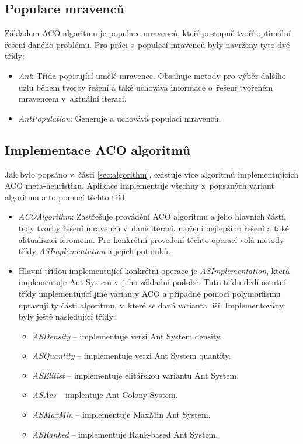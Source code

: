 \documentclass[a4paper, 12pt]{article}
\begin{document}
\subsection{Populace mravenců}
Základem ACO algoritmu je populace mravenců, kteří postupně tvoří optimální řešení daného problému. Pro práci s~populací mravenců byly navrženy tyto dvě třídy:
\begin{itemize}
  \item \emph{Ant}: Třída popisující umělé mravence. Obsahuje metody pro výběr dalšího uzlu během tvorby řešení a také uchovává informace o~řešení
  tvořeném mravencem
    v~aktuální iteraci.
  \item \emph{AntPopulation}: Generuje a uchovává populaci mravenců.
\end{itemize}

\subsection{Implementace ACO algoritmů}
Jak bylo popsáno v~části \ref{sec:algorithm}, existuje více algoritmů implementujících ACO meta-heuristiku.
Aplikace implementuje všechny z~popsaných variant algoritmu a to pomocí těchto tříd 

\begin{itemize}
  \item \emph{ACOAlgorithm}: Zastřešuje provádění ACO algoritmu a jeho hlavních částí, tedy tvorby řešení mravenců v~dané iteraci,
  uložení nejlepšího řešení a také aktualizaci feromonu. Pro konkrétní provedení těchto operací volá metody třídy \emph{ASImplementation} a jejich potomků.
  \item Hlavní třídou implementující konkrétní operace je \emph{ASImplementation}, která implementuje Ant System v~jeho základní podobě. Tuto třídu
  dědí ostatní třídy implementující jiné varianty ACO a případně pomocí polymorfismu upravují ty části algoritmu, v~které se daná varianta liší. Implementovány
  byly ještě následující třídy:
    \begin{itemize}
      \item \emph{ASDensity} -- implementuje verzi Ant System density.
      \item \emph{ASQuantity} -- implementuje verzi Ant System quantity.
      \item \emph{ASElitist} -- implementuje elitářskou variantu Ant System.
      \item \emph{ASAcs} -- implentuje Ant Colony System.
      \item \emph{ASMaxMin} -- implementuje MaxMin Ant System.
      \item \emph{ASRanked} -- implementuje Rank-based Ant System.
    \end{itemize}
\end{itemize}
\end{document}
